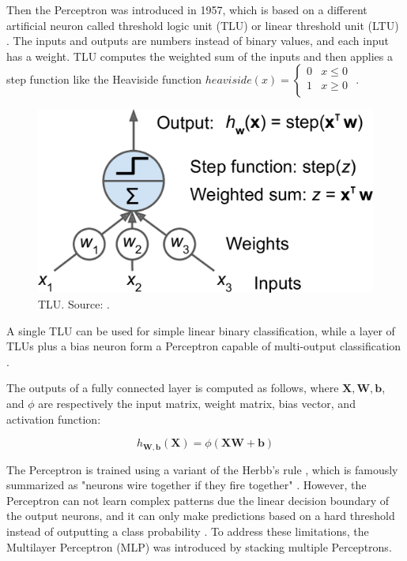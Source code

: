\documentclass[a4paper, 11pt, oneside]{article}
\begin{document}
  Then the Perceptron was introduced in 1957, which is based on a different artificial neuron called threshold logic unit
  (TLU) or linear threshold unit (LTU) \cite{rosenblatt1957perceptron}. The inputs and outputs are numbers instead of
  binary values, and each input has a weight. TLU computes the weighted sum of the inputs and then applies a step
  function like the Heaviside function
  $heaviside (x) =
  \begin{cases}
    0 & x \le 0 \\
    1 & x \geq 0 \\
  \end{cases}$
  \cite{geron2019hands, rosenblatt1957perceptron}.

  \begin{figure}[ht]
    \begin{center}
      \includegraphics[width=.8\textwidth]{tlu.png}
    \end{center}
    \caption{TLU. Source: \cite{geron2019hands}.}
  \end{figure}

  A single TLU can be used for simple linear binary classification, while a layer of TLUs plus a bias neuron form a
  Perceptron capable of multi-output classification \cite{geron2019hands}.

  The outputs of a fully connected layer is computed as follows, where $\mathbf{X}, \mathbf{W}, \mathbf{b}$, and $\phi$
  are respectively the input matrix, weight matrix, bias vector, and activation function:

  $$h_{\mathbf{W,b}}(\mathbf{X}) = \phi(\mathbf{XW} + \mathbf{b})$$

  The Perceptron is trained using a variant of the Herbb's rule \cite{hebb2005organization}, which is famously summarized
  as "neurons wire together if they fire together" \cite{lowel1992selection}. However, the Perceptron
  can not learn complex patterns due the linear decision boundary of the output neurons, and it can only make predictions
  based on a hard threshold instead of outputting a class probability \cite{geron2019hands}. To address these limitations,
  the Multilayer Perceptron (MLP) was introduced by stacking multiple Perceptrons.
\end{document}
